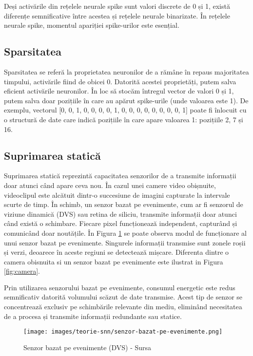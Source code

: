 Deși activările din rețelele neurale spike sunt valori discrete de 0 și 1, există diferențe semnificative între acestea și rețelele neurale binarizate. În rețelele neurale spike, momentul apariției spike-urilor este esențial.


\subsection{Sparsitatea}

Sparsitatea se referă la proprietatea neuronilor de a rămâne în repaus majoritatea timpului, activările fiind de obicei 0. Datorită acestei proprietăți, putem salva eficient activările neuronilor. În loc să stocăm întregul vector de valori 0 și 1, putem salva doar pozițiile în care au apărut spike-urile (unde valoarea este 1). De exemplu, vectorul [0, 0, 1, 0, 0, 0, 0, 1, 0, 0, 0, 0, 0, 0, 0, 0, 1] poate fi înlocuit cu o structură de date care indică pozițiile în care apare valoarea 1: pozițiile 2, 7 și 16.


\subsection{Suprimarea statică}

Suprimarea statică reprezintă capacitatea senzorilor de a transmite informații doar atunci când apare ceva nou. În cazul unei camere video obișnuite, videoclipul este alcătuit dintr-o succesiune de imagini capturate la intervale scurte de timp. În schimb, un senzor bazat pe evenimente, cum ar fi senzorul de viziune dinamică (DVS) sau retina de siliciu, transmite informații doar atunci când există o schimbare. Fiecare pixel funcționează independent, capturând și comunicând doar noutățile. În Figura \ref{fig:senzorDVS} se poate observa modul de funcționare al unui senzor bazat pe evenimente. Singurele informații transmise sunt zonele roșii și verzi, deoarece în aceste regiuni se detectează mișcare. Diferenta dintre o camera obisnuita si un senzor bazat pe evenimente este ilustrat in Figura \ref{fig:camera}.

Prin utilizarea senzorului bazat pe evenimente, consumul energetic este redus semnificativ datorită volumului scăzut de date transmise. Acest tip de senzor se concentrează exclusiv pe schimbările relevante din mediu, eliminând necesitatea de a procesa și transmite informații redundante sau statice.


\begin{figure}
    \centering
    \texttt{[image: images/teorie-snn/senzor-bazat-pe-evenimente.png]}
    \caption{Senzor bazat pe evenimente (DVS) - Sursa \cite{senzorDVS}}
    \label{fig:senzorDVS}
\end{figure}

